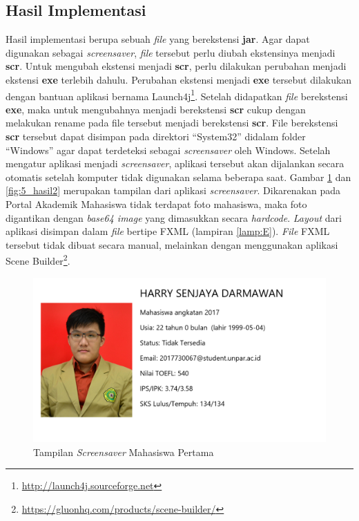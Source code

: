 \subsection{Hasil Implementasi}
Hasil implementasi berupa sebuah \textit{file} yang berekstensi \textbf{jar}. Agar dapat digunakan sebagai \textit{screensaver}, \textit{file} tersebut perlu diubah ekstensinya menjadi \textbf{scr}. Untuk mengubah ekstensi menjadi \textbf{scr}, perlu dilakukan perubahan menjadi ekstensi \textbf{exe} terlebih dahulu. Perubahan ekstensi menjadi \textbf{exe} tersebut dilakukan dengan bantuan aplikasi bernama Launch4j\footnote{\url{http://launch4j.sourceforge.net}}. Setelah didapatkan \textit{file} berekstensi \textbf{exe}, maka untuk mengubahnya menjadi berekstensi \textbf{scr} cukup dengan melakukan rename pada file tersebut menjadi berekstensi \textbf{scr}. File berekstensi \textbf{scr} tersebut dapat disimpan pada direktori ``System32'' didalam folder ``Windows'' agar dapat terdeteksi sebagai \textit{screensaver} oleh Windows. Setelah mengatur aplikasi menjadi \textit{screensaver}, aplikasi tersebut akan dijalankan secara otomatis setelah komputer tidak digunakan selama beberapa saat. Gambar \ref{fig:5_hasil} dan \ref{fig:5_hasil2} merupakan tampilan dari aplikasi \textit{screensaver}. Dikarenakan pada Portal Akademik Mahasiswa tidak terdapat foto mahasiswa, maka foto digantikan dengan \textit{base64 image} yang dimasukkan secara \textit{hardcode}. \textit{Layout} dari aplikasi disimpan dalam \textit{file} bertipe FXML (lampiran \ref{lamp:E}). \textit{File} FXML tersebut tidak dibuat secara manual, melainkan dengan menggunakan aplikasi Scene Builder\footnote{\url{https://gluonhq.com/products/scene-builder/}}. 

\begin{figure}[H]
	\centering
	\includegraphics[scale=0.3]{Gambar/hasil.png}
	\caption{Tampilan \textit{Screensaver} Mahasiswa Pertama}
	\label{fig:5_hasil}
\end{figure}

